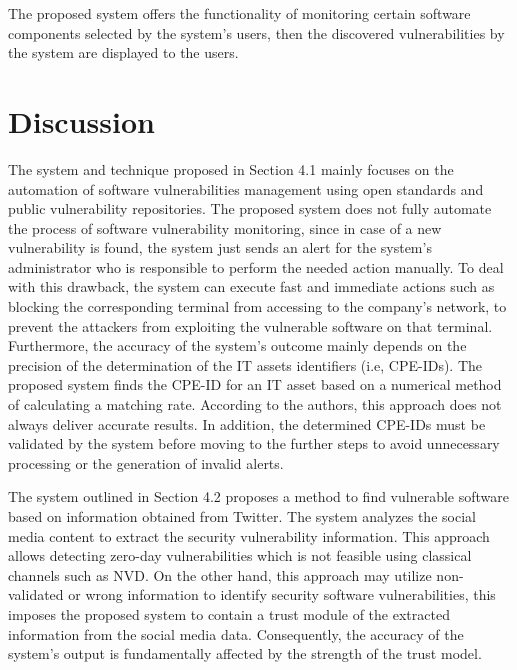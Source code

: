 \documentclass{llncs}
\begin{document}
The proposed system offers the functionality of monitoring certain software components selected by the system's users, then the discovered vulnerabilities by the system are displayed to the users.

\section{Discussion}

\par The system and technique proposed in Section 4.1 mainly focuses on the automation of software vulnerabilities management using open standards and public vulnerability repositories. The proposed system does not fully automate the process of software vulnerability monitoring, since in case of a new vulnerability is found, the system just sends an alert for the system's administrator who is responsible to perform the needed action manually. To deal with this drawback, the system can execute fast and immediate actions such as  blocking the corresponding terminal from accessing to the company's network, to prevent the attackers from exploiting the vulnerable software on that terminal. Furthermore, the accuracy of the system's outcome mainly depends on the precision of the determination of the IT assets identifiers (i.e, CPE-IDs). The proposed system finds the CPE-ID for an IT asset based on a numerical method of calculating a matching rate. According to the authors, this approach does not always deliver accurate results. In addition, the determined CPE-IDs must be validated by the system before moving to the further steps to avoid unnecessary processing or the generation of invalid alerts.


\par The system outlined in Section 4.2 proposes a method to find vulnerable software based on information obtained from Twitter. The system analyzes the social media content to extract the security vulnerability information. This approach allows detecting zero-day vulnerabilities which is not feasible using classical channels such as NVD. On the other hand, this approach may utilize non- validated or wrong information to  identify security software vulnerabilities, this imposes the proposed system to contain a trust module of the extracted information from the social media data. Consequently, the accuracy of the system's output is  fundamentally affected by the strength of the trust model.
   
\end{document}
